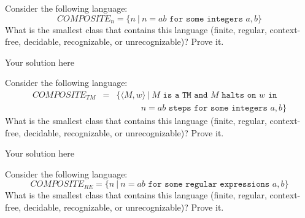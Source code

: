 \documentclass[12pt]{article}
\newenvironment{exercise}[2][Exercise]{\begin{trivlist}
\item[\hskip \labelsep {\bfseries #1}\hskip \labelsep {\bfseries #2.}]}{\end{trivlist}}
\newenvironment{solution}[1][{\color{red} Solution:}]{\begin{trivlist}
\item[\hskip \labelsep {\bfseries #1}\hskip \labelsep {\bfseries}]}{\end{trivlist}}
\begin{document}
 


\newcommand{\studentName}{YOUR NAME HERE} %

\newcommand{\collaborators}{
	with \textit{COLLABORATORS' NAMES HERE}
}

\begin{exercise}{1}
Consider the following language:
\[COMPOSITE_n = \{n \ | \ n = ab \texttt{ for some integers } a,b\}\]
What is the smallest class that contains this language (finite, regular, context-free, decidable, recognizable, or unrecognizable)? Prove it.
\end{exercise}

\begin{solution}
Your solution here
\end{solution}

\clearpage

\begin{exercise}{2}
Consider the following language:
\begin{eqnarray*}
COMPOSITE_{TM} & = & \{\langle M,w \rangle \ | \ M \texttt{ is a TM and } M \texttt{ halts on } w \texttt{ in }\\
&& \ \ \ \ \ \ \ \ \ \ \ \ \ n = ab \texttt{ steps for some integers } a,b\}
\end{eqnarray*}
What is the smallest class that contains this language (finite, regular, context-free, decidable, recognizable, or unrecognizable)? Prove it.
\end{exercise}

\begin{solution}
Your solution here
\end{solution}

\clearpage
\begin{exercise}{3}
Consider the following language:
\[COMPOSITE_{RE} = \{n \ | \ n = ab \texttt{ for some regular expressions } a,b\}\]
What is the smallest class that contains this language (finite, regular, context-free, decidable, recognizable, or unrecognizable)? Prove it.
\end{exercise}
\end{document}
